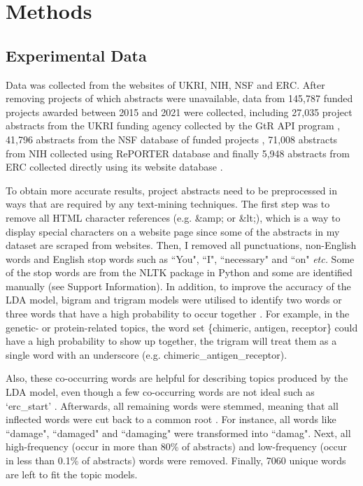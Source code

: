 \section{Methods}

\subsection{Experimental Data}

Data was collected from the websites of UKRI, NIH, NSF and ERC. After removing projects of which abstracts were unavailable, data from 145,787 funded projects awarded between 2015 and 2021 were collected, including 27,035 project abstracts from the UKRI funding agency collected by the GtR API program \cite{UKRI}, 41,796 abstracts from the NSF database of funded projects \cite{NSF}, 71,008 abstracts from NIH collected using RePORTER database and finally 5,948 abstracts from ERC collected directly using its website database \cite{NIH, ERC}.

To obtain more accurate results, project abstracts need to be preprocessed in ways that are required by any text-mining techniques. The first step was to remove all HTML character references (e.g. \&amp; or \&lt;), which is a way to display special characters on a website page since some of the abstracts in my dataset are scraped from websites. Then, I removed all punctuations, non-English words and English stop words such as ``You", ``I", ``necessary" and ``on" \textit{etc.} Some of the stop words are from the NLTK package in Python and some are identified manually (see Support Information). In addition, to improve the accuracy of the LDA model, bigram and trigram models were utilised to identify two words or three words that have a high probability to occur together \cite{ahmed2009}. For example,  in the genetic- or protein-related topics, the word set \{chimeric, antigen, receptor\} could have a high probability to show up together, the trigram will treat them as a single word with an underscore (e.g. chimeric\_antigen\_receptor).

Also, these co-occurring words are helpful for describing topics produced by the LDA model, even though a few co-occurring words are not ideal such as `erc\_start' \cite{sseutm}. Afterwards, all remaining words were stemmed, meaning that all inflected words were cut back to a common root \cite{rbcbaestmro32000a}. For instance, all words like ``damage", ``damaged" and ``damaging" were transformed into ``damag". Next, all high-frequency (occur in more than 80\% of abstracts) and low-frequency (occur in less than 0.1\% of abstracts) words were removed. Finally, 7060 unique words are left to fit the topic models.

